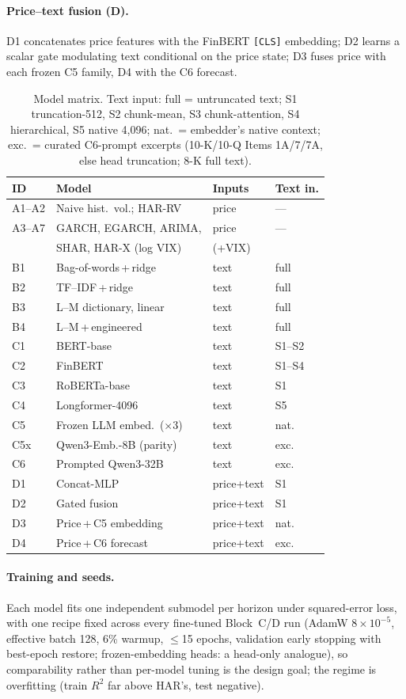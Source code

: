 \paragraph{Price--text fusion (D).}
D1 concatenates price features with the FinBERT \texttt{[CLS]} embedding; D2 learns a scalar gate modulating text conditional on the price state; D3 fuses price with each frozen C5 family, D4 with the C6 forecast.

\begin{table}[t]
\centering
{\small
\setlength{\tabcolsep}{2pt}%
\begin{tabular}{@{}llll@{}}
\toprule
ID & Model & Inputs & Text in. \\
\midrule
A1--A2 & Naive hist.\ vol.; HAR-RV & price & --- \\
A3--A7 & GARCH, EGARCH, ARIMA, & price & --- \\
 & SHAR, HAR-X (log VIX) & (+VIX) & \\
\midrule
B1 & Bag-of-words\,+\,ridge & text & full \\
B2 & TF--IDF\,+\,ridge & text & full \\
B3 & L--M dictionary, linear & text & full \\
B4 & L--M\,+\,engineered & text & full \\
\midrule
C1 & BERT-base & text & S1--S2 \\
C2 & FinBERT & text & S1--S4 \\
C3 & RoBERTa-base & text & S1 \\
C4 & Longformer-4096 & text & S5 \\
C5 & Frozen LLM embed.\ ($\times$3) & text & nat. \\
C5x & Qwen3-Emb.-8B (parity) & text & exc. \\
C6 & Prompted Qwen3-32B & text & exc. \\
\midrule
D1 & Concat-MLP & price+text & S1 \\
D2 & Gated fusion & price+text & S1 \\
D3 & Price\,+\,C5 embedding & price+text & nat. \\
D4 & Price\,+\,C6 forecast & price+text & exc. \\
\bottomrule
\end{tabular}
}
\caption{Model matrix. Text input: full = untruncated text; S1 truncation-512, S2 chunk-mean, S3 chunk-attention, S4 hierarchical, S5 native 4{,}096; nat.\ = embedder's native context; exc.\ = curated C6-prompt excerpts (10-K/10-Q Items 1A/7/7A, else head truncation; 8-K full text).}
\label{tab:models}
\end{table}

\paragraph{Training and seeds.}
Each model fits one independent submodel per horizon under squared-error loss, with one recipe fixed across every fine-tuned Block~C/D run (AdamW $8\times10^{-5}$, effective batch 128, 6\% warmup, $\le$15 epochs, validation early stopping with best-epoch restore; frozen-embedding heads: a head-only analogue), so comparability rather than per-model tuning is the design goal; the regime is overfitting (train $R^2$ far above HAR's, test negative).
